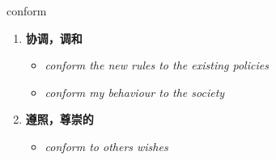 
\begin{frame}
{\huge conform}
\begin{center}
\begin{enumerate}\Large
  \item \textbf{协调，调和}
  \begin{itemize}
    \item \em{\Large{conform the new rules to the existing policies}}
    \item \em{\Large{conform my behaviour to the society}}
  \end{itemize}
  \item \textbf{遵照，尊崇的}
  \begin{itemize}
    \item \em{\Large{conform to others wishes}}
  \end{itemize}
\end{enumerate}
\end{center}
\end{frame}
